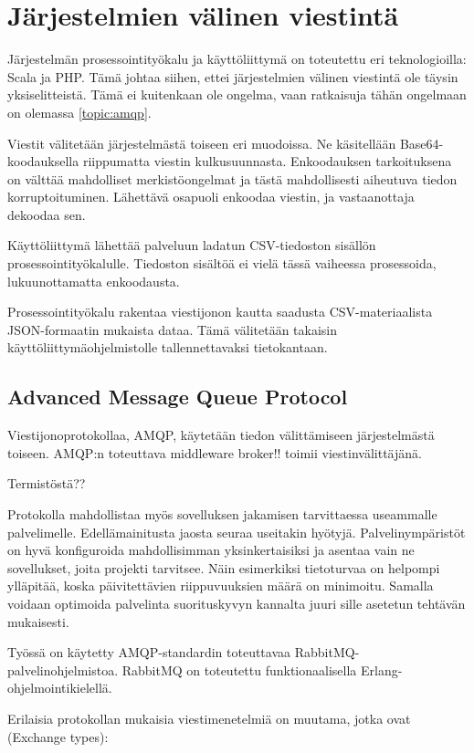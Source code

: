 \documentclass[11pt,a4paper,oneside]{memoir}
\begin{document}
\section{Järjestelmien välinen viestintä}
Järjestelmän prosessointityökalu ja käyttöliittymä on toteutettu eri teknologioilla: Scala ja PHP. Tämä johtaa siihen, ettei järjestelmien välinen viestintä ole täysin yksiselitteistä. Tämä ei kuitenkaan ole ongelma, vaan ratkaisuja tähän ongelmaan on olemassa \vref{topic:amqp}.

Viestit välitetään järjestelmästä toiseen eri muodoissa. Ne käsitellään Base64-koodauksella riippumatta viestin kulkusuunnasta. Enkoodauksen tarkoituksena on välttää mahdolliset merkistöongelmat ja tästä mahdollisesti aiheutuva tiedon korruptoituminen. Lähettävä osapuoli enkoodaa viestin, ja vastaanottaja dekoodaa sen.

Käyttöliittymä lähettää palveluun ladatun CSV-tiedoston sisällön prosessointityökalulle. Tiedoston sisältöä ei vielä tässä vaiheessa prosessoida, lukuunottamatta enkoodausta.

Prosessointityökalu rakentaa viestijonon kautta saadusta CSV-materiaalista JSON-formaatin mukaista dataa. Tämä välitetään takaisin käyttöliittymäohjelmistolle tallennettavaksi tietokantaan. 

\subsection{Advanced Message Queue Protocol\label{topic:amqp}}
Viestijonoprotokollaa, AMQP, käytetään tiedon välittämiseen järjestelmästä toiseen. AMQP:n toteuttava middleware broker!! toimii viestinvälittäjänä.

Termistöstä??

Protokolla mahdollistaa myös sovelluksen jakamisen tarvittaessa useammalle palvelimelle. Edellämainitusta jaosta seuraa useitakin hyötyjä. Palvelinympäristöt on hyvä konfiguroida mahdollisimman yksinkertaisiksi ja asentaa vain ne sovellukset, joita projekti tarvitsee. Näin esimerkiksi tietoturvaa on helpompi ylläpitää, koska päivitettävien riippuvuuksien määrä on minimoitu. Samalla voidaan optimoida palvelinta suorituskyvyn kannalta juuri sille asetetun tehtävän mukaisesti.

Työssä on käytetty AMQP-standardin toteuttavaa RabbitMQ-palvelinohjelmistoa. RabbitMQ on toteutettu funktionaalisella Erlang-ohjelmointikielellä. 

Erilaisia protokollan mukaisia viestimenetelmiä on muutama, jotka ovat (Exchange types):
\end{document}
